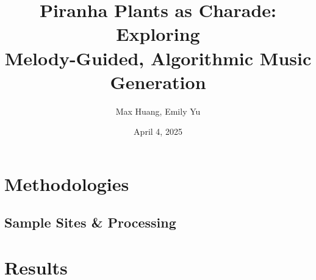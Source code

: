 \documentclass[
	a4paper, %
	10pt, %
	twoside, %
]{LTJournalArticle}
\title{Piranha Plants as Charade: Exploring \\ Melody-Guided, Algorithmic Music Generation} %
\author{Max Huang, Emily Yu}
\date{April 4, 2025}
\begin{document}
\maketitle %













\section{Methodologies}

\subsection{Sample Sites \& Processing}


\section{Results}


\end{document}
